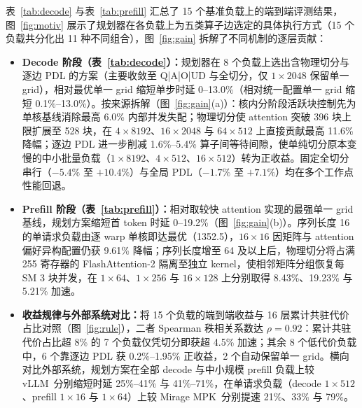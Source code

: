 表~\ref{tab:decode} 与表~\ref{tab:prefill} 汇总了 15 个基准负载上的端到端评测结果，图~\ref{fig:motiv} 展示了规划器在各负载上为五类算子边选定的具体执行方式（15 个负载共分化出 11 种不同组合），图~\ref{fig:gain} 拆解了不同机制的逐层贡献：
\begin{itemize}[leftmargin=2.0em,itemsep=2pt]
\item \textbf{Decode 阶段（表~\ref{tab:decode}）：}规划器在 8 个负载上选出含物理切分与逐边 PDL 的方案（主要收敛至 Q|A|O|UD 与全切分，仅 $1\times 2048$ 保留单一 grid），相对最优单一 grid 缩短单步时延 0--13.0\%（相对统一配置单一 grid 缩短 0.1\%--13.0\%）。按来源拆解（图~\ref{fig:gain}(a)）：核内分阶段活跃块控制先为单核基线消除最高 6.0\% 内部并发失配；物理切分使 attention 突破 396 块上限扩展至 528 块，在 $4\times 8192$、$16\times 2048$ 与 $64\times 512$ 上直接贡献最高 11.6\% 降幅；逐边 PDL 进一步削减 1.6\%--5.4\% 算子间等待间隙，使单纯切分原本变慢的中小批量负载（$1\times 8192$、$4\times 512$、$16\times 512$）转为正收益。固定全切分串行（$-5.4\%$ 至 $+10.4\%$）与全局 PDL（$-1.7\%$ 至 $+7.1\%$）均在多个工作点性能回退。
\item \textbf{Prefill 阶段（表~\ref{tab:prefill}）：}相对取较快 attention 实现的最强单一 grid 基线，规划方案缩短首 token 时延 0--19.2\%（图~\ref{fig:gain}(b)）。序列长度 16 的单请求负载由逐 warp 单核即达最优（1352.5\us），$16\times 16$ 因矩阵与 attention 偏好异构配置仍获 9.61\% 降幅；序列长度增至 64 及以上后，物理切分将占满 255 寄存器的 FlashAttention-2 隔离至独立 kernel，使相邻矩阵分组恢复每 SM 3 块并发，在 $1\times 64$、$1\times 256$ 与 $16\times 128$ 上分别取得 8.43\%、19.23\% 与 5.21\% 加速。
\item \textbf{收益规律与外部系统对比：}将 15 个负载的端到端收益与 16 层累计共驻代价占比对照（图~\ref{fig:rule}），二者 Spearman 秩相关系数达 $\rho=0.92$：累计共驻代价占比超 8\% 的 7 个负载仅凭切分即获超 4.5\% 加速；其余 8 个低代价负载中，6 个靠逐边 PDL 获 0.2\%--1.95\% 正收益，2 个自动保留单一 grid。横向对比外部系统，规划方案在全部 decode 与中小规模 prefill 负载上较 vLLM~\pVllm 分别缩短时延 25\%--41\% 与 41\%--71\%，在单请求负载（decode $1\times 512$、prefill $1\times 16$ 与 $1\times 64$）上较 Mirage MPK~\pMPK 分别提速 21\%、33\% 与 79\%。
\end{itemize}

